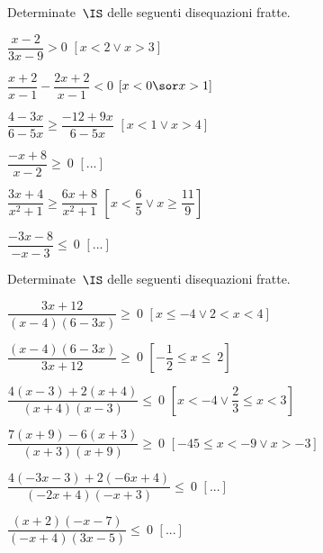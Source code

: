 \begin{esercizio}[]
\label{ese:21.55}
Determinate~$\IS$ delle seguenti disequazioni fratte.
\begin{multicols}{2}
\begin{enumeratea}
\spazielenx
\item $\dfrac{x-2}{3x-9}>0$ \hfill $\left[x<2\vee x>3\right]$
\item $\dfrac{x+2}{x-1}-\dfrac{2x+2}{x-1} < 0$ 
\hfill $\left[x< 0 \sor x>1\right]$
\item $\dfrac{4-3x}{6-5x}\geqslant \dfrac{-12+9x}{6-5x}$ 
\hfill $\left[x<1\vee x>4\right]$
\item $\dfrac{-x+8}{x-2}\ge~0$ \hfill $\left[...\right]$
\item $\dfrac{3x+4}{x^{2}+1}\ge\dfrac{6x+8}{x^{2}+1}$ 
 \hfill $\left[x<\dfrac{6}{5}\vee x\ge\dfrac{11}{9}\right]$
\item $\dfrac{-3x-8}{-x-3}\le~0$ \hfill $\left[...\right]$
\end{enumeratea}
\end{multicols}
\end{esercizio}

\begin{esercizio}[]
\label{ese:21.55}
Determinate~$\IS$ delle seguenti disequazioni fratte.
\begin{enumeratea}
\spazielenx
\item $\dfrac{3x+12}{(x-4)(6-3x)}\geqslant~0$
 \hfill $\left[x\le -4 \vee 2<x<4\right]$
\item $\dfrac{(x-4)(6-3x)}{3x+12}\geqslant~0$
 \hfill $\left[-{\dfrac{1}{2}}\le x\le~2\right]$
\item $\dfrac{4(x-3)+2(x+4)}{(x+4)(x-3)}\leqslant~0$
 \hfill $\left[x<-4\vee\dfrac{2}{3}\le x<3\right]$
\item $\dfrac{7(x+9)-6(x+3)}{(x+3)(x+9)}\geqslant~0$
 \hfill $\left[-45\le x<-9\vee x>-3\right]$
\item $\dfrac{4(-3x-3)+2(-6x+4)}{(-2x+4)(-x+3)}\leqslant~0$
 \hfill $\left[...\right]$
\item $\dfrac{(x+2)(-x-7)}{(-x+4)(3x-5)}\leqslant~0$
 \hfill $\left[...\right]$
\end{enumeratea}
\end{esercizio}

